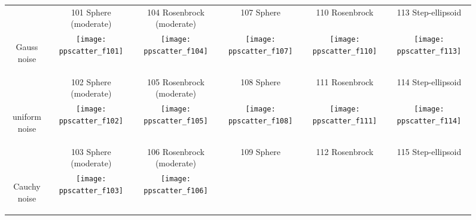 \documentclass[conference]{IEEEtran}
\begin{document}
\begin{figure*}
\small
\centering
\begin{tabular}{@{}c@{}*{5}{@{}c@{}}}
 & {\sf\footnotesize 101 Sphere (moderate)} & {\sf\footnotesize 104 Rosenbrock (moderate)} & {\sf\footnotesize 107 Sphere} & {\sf\footnotesize 110 Rosenbrock} & {\sf\footnotesize 113 Step-ellipsoid} \\
\begin{turn}{90}\parbox{0.175\textwidth}{\centering\sf Gauss noise}\end{turn} &
    \texttt{[image: ppscatter\_f101]}&
    \texttt{[image: ppscatter\_f104]}&
    \texttt{[image: ppscatter\_f107]}&
    \texttt{[image: ppscatter\_f110]}&
    \texttt{[image: ppscatter\_f113]}\\
 & {\sf\footnotesize 102 Sphere (moderate)} & {\sf\footnotesize 105 Rosenbrock (moderate)} & {\sf\footnotesize 108 Sphere} & {\sf\footnotesize 111 Rosenbrock} & {\sf\footnotesize 114 Step-ellipsoid}\\
\begin{turn}{90}\parbox{0.175\textwidth}{\centering\sf uniform noise}\end{turn} &
    \texttt{[image: ppscatter\_f102]}&
    \texttt{[image: ppscatter\_f105]}&
    \texttt{[image: ppscatter\_f108]}&
    \texttt{[image: ppscatter\_f111]}&
    \texttt{[image: ppscatter\_f114]}\\
 & {\sf\footnotesize 103 Sphere (moderate)} & {\sf\footnotesize 106 Rosenbrock (moderate)} & {\sf\footnotesize 109 Sphere} & {\sf\footnotesize 112 Rosenbrock} & {\sf\footnotesize 115 Step-ellipsoid}\\
\begin{turn}{90}\parbox{0.175\textwidth}{\centering\sf Cauchy noise}\end{turn} &
    \texttt{[image: ppscatter\_f103]}&
    \texttt{[image: ppscatter\_f106]}&

\end{tabular}
\end{figure*}
\end{document}
